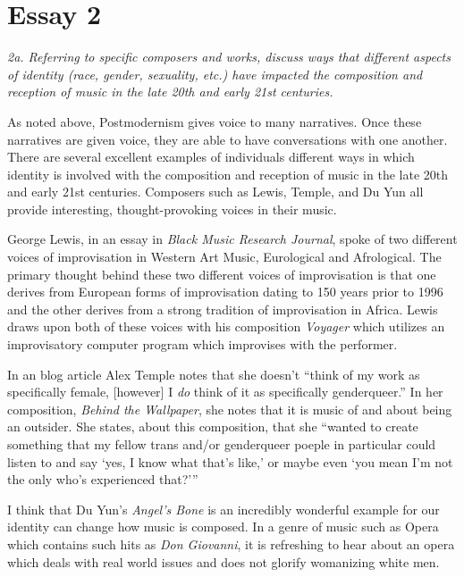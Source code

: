 \documentclass[12pt]{article}
\begin{document}
\section*{Essay 2}
\label{sec:essay-2}

\emph{2a. Referring to specific composers and works, discuss ways that different aspects of identity (race, gender, sexuality, etc.) have impacted the composition and reception of music in the late 20th and early 21st centuries.}

As noted above, Postmodernism gives voice to many narratives. Once
these narratives are given voice, they are able to have conversations
with one another. There are several excellent examples of individuals
different ways in which identity is involved with the composition and
reception of music in the late 20th and early 21st
centuries. Composers such as Lewis, Temple, and Du Yun all provide
interesting, thought-provoking voices in their music.

George Lewis, in an essay in \emph{Black Music Research Journal},
spoke of two different voices of improvisation in Western Art Music,
Eurological and Afrological.\autocite{lewis} The primary thought
behind these two different voices of improvisation is that one derives
from European forms of improvisation dating to 150 years prior to 1996
and the other derives from a strong tradition of improvisation in
Africa. Lewis draws upon both of these voices with his composition
\emph{Voyager} which utilizes an improvisatory computer program which
improvises with the performer.

In an blog article Alex Temple notes that she doesn't ``think of my
work as specifically female, [however] I \emph{do} think of it as
specifically genderqueer.''\autocite{temple} In her composition,
\emph{Behind the Wallpaper}, she notes that it is music of and about
being an outsider. She states, about this composition, that she
``wanted to create something that my fellow trans and/or genderqueer
poeple in particular could listen to and say `yes, I know what that's
like,' or maybe even `you mean I'm not the only who's experienced
that?'''\autocite{temple}

I think that Du Yun's \emph{Angel's Bone} is an incredibly wonderful
example for our identity can change how music is composed. In a genre
of music such as Opera which contains such hits as \emph{Don
  Giovanni}, it is refreshing to hear about an opera which deals with
real world issues and does not glorify womanizing white men.

\printbibliography
\end{document}
